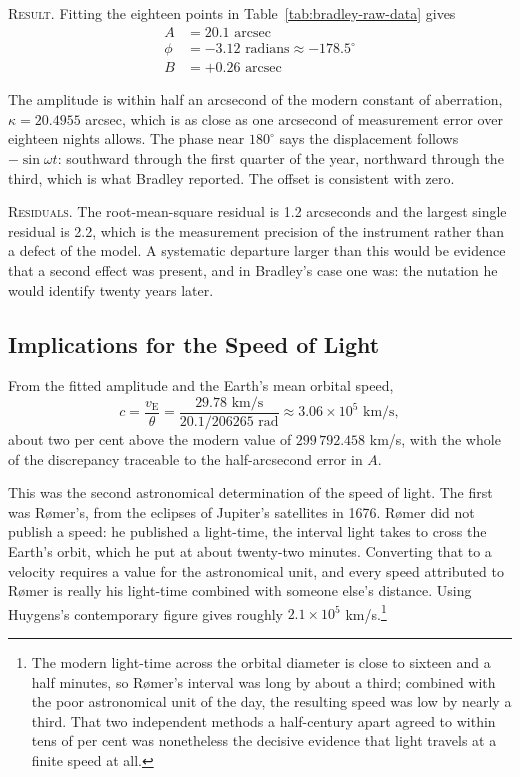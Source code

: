 \textsc{Result.} Fitting the eighteen points in Table~\ref{tab:bradley-raw-data} gives
\begin{align*}
  A &= 20.1 \text{ arcsec} \\
  \phi &= -3.12 \text{ radians} \approx -178.5^{\circ} \\
  B &= +0.26 \text{ arcsec}
\end{align*}

The amplitude is within half an arcsecond of the modern constant of aberration, $\kappa = 20.4955$ arcsec, which is as close as one arcsecond of measurement error over eighteen nights allows. The phase near $180^{\circ}$ says the displacement follows $-\sin\omega t$: southward through the first quarter of the year, northward through the third, which is what Bradley reported. The offset is consistent with zero.

\textsc{Residuals.} The root-mean-square residual is 1.2 arcseconds and the largest single residual is 2.2, which is the measurement precision of the instrument rather than a defect of the model. A systematic departure larger than this would be evidence that a second effect was present, and in Bradley's case one was: the nutation he would identify twenty years later.

\subsection*{Implications for the Speed of Light}

From the fitted amplitude and the Earth's mean orbital speed,
\[
  c = \frac{v_{\text{E}}}{\theta} = \frac{29.78 \text{ km/s}}{20.1 / 206265 \text{ rad}} \approx 3.06 \times 10^5 \text{ km/s},
\]
about two per cent above the modern value of $299\,792.458$ km/s, with the whole of the discrepancy traceable to the half-arcsecond error in $A$.

This was the second astronomical determination of the speed of light. The first was Rømer's, from the eclipses of Jupiter's satellites in 1676. Rømer did not publish a speed: he published a light-time, the interval light takes to cross the Earth's orbit, which he put at about twenty-two minutes. Converting that to a velocity requires a value for the astronomical unit, and every speed attributed to Rømer is really his light-time combined with someone else's distance. Using Huygens's contemporary figure gives roughly $2.1 \times 10^5$ km/s.\footnote{The modern light-time across the orbital diameter is close to sixteen and a half minutes, so R\o{}mer's interval was long by about a third; combined with the poor astronomical unit of the day, the resulting speed was low by nearly a third. That two independent methods a half-century apart agreed to within tens of per cent was nonetheless the decisive evidence that light travels at a finite speed at all.}

